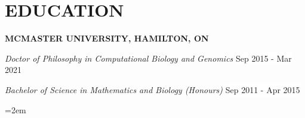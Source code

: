 \documentclass[paper=a4,fontsize=11pt]{scrartcl}	 			%
\newlength{\spacebox}
\newcommand{\NewPart}[1]{\section*{\uppercase{#1}}}
\newcommand{\PersonalEntry}[2]{
		\noindent\hangindent=2em\hangafter=0 		%
		\parbox{\spacebox}{						%
		\textit{#1}}								%
		\hspace{1.5em} #2 \par}					%
\newcommand{\SkillsEntry}[2]{						%
		\noindent\hangindent=2em\hangafter=0 		%
		\parbox{\spacebox}{						%
		\textit{#1}}								%
		\hspace{1.5em} #2 \par}					%
\newcommand{\EducationEntry}[4]{
		\noindent \textbf{#1} \hfill 					%
		\colorbox{White}{%
			\parbox{10em}{%
			\hfill\color{Black}#2}} \par				%
		\noindent \textit{#3} \par					%
		\noindent\hangindent=2em\hangafter=0 \small #4 	%
		\normalsize \par}
\newcommand{\WorkEntryTwo}[6]{						%
	\noindent \textbf{#1} \par		%
	\noindent \textit{\noindent #2} \hfill 					%
	\noindent \colorbox{White}{\color{Black}#3} \par
	\noindent \textit{\noindent #4} \hfill 					%
	\noindent \colorbox{White}{\color{Black}#5} \par					%
	\noindent\hangindent=2em\hangafter=0 \small #6 	%
	\normalsize \par}
\newcommand{\ServiceEntry}[2]{					%
		\noindent \textit{#1} \par					%
		\noindent\hangindent=2em\hangafter=0 \small #2 	%
		\normalsize \par}
\begin{document}
%
%
%
%
%
%

\NewPart{Education}{} 
\WorkEntryTwo{\MakeUppercase{McMaster University, Hamilton, ON}}{Doctor of Philosophy in Computational Biology and Genomics}{Sep 2015 - Mar 2021}
{Bachelor of Science in Mathematics and Biology (Honours)}{Sep 2011 - Apr 2015}{}
\end{document}
